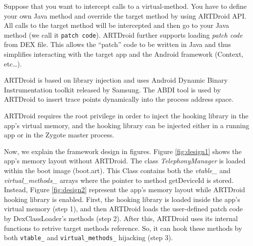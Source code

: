 Suppose that you want to intercept calls to a virtual-method. You have to define your own Java method and override the target method by using ARTDroid API. All calls to the target method will be intercepted and then go to your Java method (we call it {\tt patch code}). ARTDroid further supports loading \textit{patch code} from DEX file. This allows the “patch” code to be written in Java and thus simplifies interacting with the target app and the Android framework (Context, etc…). 

ARTDroid is based on library injection and uses Android Dynamic Binary Instrumentation toolkit\cite{ADBI} released by Samsung. The ABDI tool is used by ARTDroid to insert trace points dynamically into the process address space. 


ARTDroid requires the root privilege in order to inject the hooking library in the app's virtual memory, and the hooking library can be injected either in a running app or in the Zygote\cite{lee2014zygote} master process.

Now, we explain the framework design in figures. Figure \ref{fig:design1} shows the app's memory layout without ARTDroid. The class \textit{TelephonyManager} is loaded within the boot image (boot.art). This Class contains both the \textit{vtable\_} and \textit{virtual\_methods\_} arrays where the pointer to method getDeviceId is stored. Instead, Figure \ref{fig:design2} represent the app's memory layout while ARTDroid hooking library is enabled. First, the hooking library is loaded inside the app's virtual memory (step 1), and then ARTDroid loads the user-defined patch code by DexClassLoader's methods (step 2). After this, ARTDroid uses its internal functions to retrive target methods reference. So, it can hook these methods by both {\tt vtable\_} and {\tt virtual\_methods\_} hijacking (step 3). \\

%	



